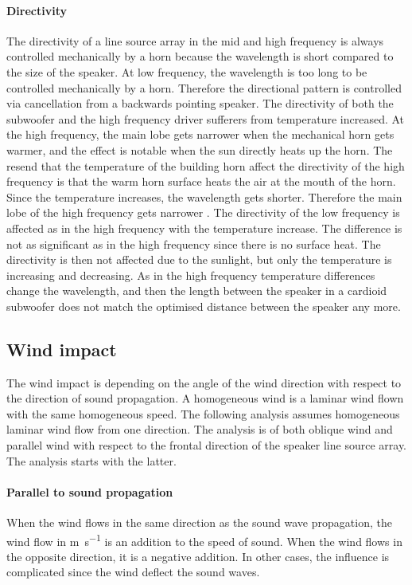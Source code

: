 \paragraph{Directivity} The directivity of a line source array in the mid and high frequency is always controlled mechanically by a horn because the wavelength is short compared to the size of the speaker. At low frequency, the wavelength is too long to be controlled mechanically by a horn. Therefore the directional pattern is controlled via cancellation from a backwards pointing speaker. The directivity of both the subwoofer and the high frequency driver sufferers from temperature increased. At the high frequency, the main lobe gets narrower when the mechanical horn gets warmer, and the effect is notable when the sun directly heats up the horn. The resend that the temperature of the building horn affect the directivity of the high frequency is that the warm horn surface heats the air at the mouth of the horn.  Since the temperature increases, the wavelength gets shorter. Therefore the main lobe of the high frequency gets narrower \citep{levine2018influence}. The directivity of the low frequency is affected as in the high frequency with the temperature increase. The difference is not as significant as in the high frequency since there is no surface heat. The directivity is then not affected due to the sunlight, but only the temperature is increasing and decreasing. As in the high frequency temperature differences change the wavelength, and then the length between the speaker in a cardioid subwoofer does not match the optimised distance between the speaker any more. 



\subsection{Wind impact}
The wind impact is depending on the angle of the wind direction with respect to the direction of sound propagation. A homogeneous wind is a laminar wind flown with the same homogeneous speed. The following analysis assumes homogeneous laminar wind flow from one direction. The analysis is of both oblique wind and parallel wind with respect to the frontal direction of the speaker line source array. The analysis starts with the latter. 

\paragraph{Parallel to sound propagation} When the wind flows in the same direction as the sound wave propagation, the wind flow in \si{\meter\per\second} is an addition to the speed of sound. When the wind flows in the opposite direction, it is a negative addition.  In other cases, the influence is complicated since the wind deflect the sound waves.


